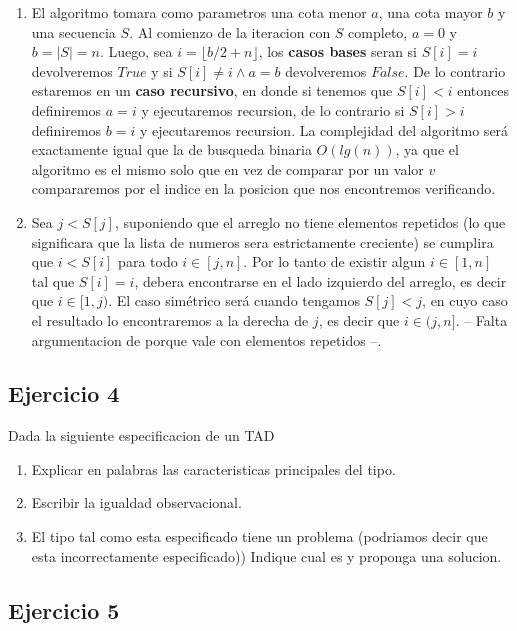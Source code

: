 \documentclass[10pt, a4paper]{article}
\begin{document}
\begin{enumerate}
 \item El algoritmo tomara como parametros una cota menor $a$, una cota mayor $b$ y una secuencia $S$. Al comienzo de la iteracion con $S$ completo, $a=0$ y $b=|S|=n$. Luego, sea $i = \lfloor b/2+n \rfloor$, los \textbf{casos bases} seran si $S[i] = i$ devolveremos $True$ y si $S[i] \not= i \land a=b$ devolveremos $False$. De lo contrario estaremos en un \textbf{caso recursivo}, en donde si tenemos que $S[i] < i$ entonces definiremos $a=i$ y ejecutaremos recursion, de lo contrario si $S[i] > i$ definiremos $b=i$ y ejecutaremos recursion. La complejidad del algoritmo ser\'a exactamente igual que la de busqueda binaria $O(lg(n))$, ya que el algoritmo es el mismo solo que en vez de comparar por un valor $v$ compararemos por el indice en la posicion que nos encontremos verificando.
 
 \item Sea $j < S[j]$, suponiendo que el arreglo no tiene elementos repetidos (lo que significara que la lista de numeros sera estrictamente creciente) se cumplira que $i < S[i]$ para todo $i \in [j,n]$. Por lo tanto de existir algun $i \in [1,n]$ tal que $S[i]=i$, debera encontrarse en el lado izquierdo del arreglo, es decir que $i \in [1,j)$. El caso sim\'etrico ser\'a cuando tengamos $S[j] < j$, en cuyo caso el resultado lo encontraremos a la derecha de $j$, es decir que $i \in (j,n]$. -- {\color{red}Falta argumentacion de porque vale con elementos repetidos} --.
\end{enumerate}

\subsection*{Ejercicio 4}

Dada la siguiente especificacion de un TAD
\begin{enumerate}
 \item Explicar en palabras las caracteristicas principales del tipo.
 \item Escribir la igualdad observacional.
 \item El tipo tal como esta especificado tiene un problema (podriamos decir que esta incorrectamente especificado)) Indique cual es y proponga una solucion.
\end{enumerate}

\subsection*{Ejercicio 5}
\end{document}

